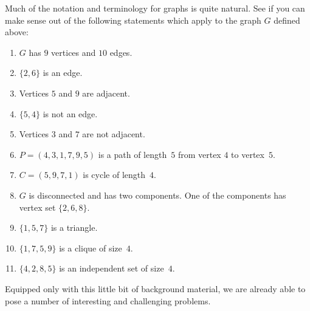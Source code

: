 \medskip
Much of the notation and terminology for graphs is quite natural.
See if you can make sense out of the following statements which
apply to the graph $G$ defined above:
\begin{enumerate}
\item $G$ has $9$ vertices and $10$ edges.
\item $\{2,6\}$ is an edge.
\item Vertices $5$ and $9$ are adjacent.
\item $\{5,4\}$ is not an edge.
\item Vertices $3$ and $7$ are not adjacent.
\item $P = (4, 3,1, 7,9,5)$ is a path 
of length~$5$ from vertex $4$ to vertex~$5$.
\item $C=(5,9,7,1)$ is cycle of length~$4$.
\item $G$ is disconnected and has two components.
One of the components has vertex set $\{2,6,8\}$.
\item $\{1,5,7\}$ is a triangle.
\item $\{1,7,5,9\}$ is a clique of size~$4$.
\item $\{4,2,8,5\}$ is an independent set of
size~$4$.
\end{enumerate}

Equipped only with this little bit of background
material, we are already able to pose a number
of interesting and challenging problems.  

